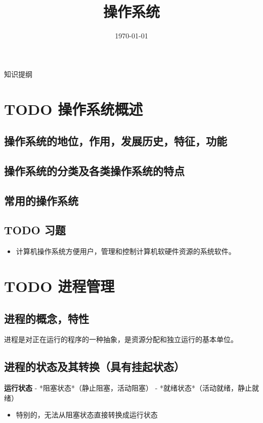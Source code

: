\documentclass[11pt]{article}
\date{\today}
\title{操作系统}
\begin{document}
\maketitle
\tableofcontents

知识提纲
\section{{\bfseries\sffamily TODO} 操作系统概述}
\label{sec-1}
\subsection{操作系统的地位，作用，发展历史，特征，功能}
\label{sec-1-1}
\subsection{操作系统的分类及各类操作系统的特点}
\label{sec-1-2}
\subsection{常用的操作系统}
\label{sec-1-3}
\subsection{{\bfseries\sffamily TODO} 习题}
\label{sec-1-4}
\begin{itemize}
\item 计算机操作系统方便用户，管理和控制计算机软硬件资源的系统软件。
\end{itemize}
\section{{\bfseries\sffamily TODO} 进程管理}
\label{sec-2}
\subsection{进程的概念，特性}
\label{sec-2-1}
进程是对正在运行的程序的一种抽象，是资源分配和独立运行的基本单位。
\subsection{进程的状态及其转换（具有挂起状态）}
\label{sec-2-2}
\textbf{运行状态} - *阻塞状态*（静止阻塞，活动阻塞） - *就绪状态*（活动就绪，静止就绪）
\begin{itemize}
\item 特别的，无法从阻塞状态直接转换成运行状态
\end{itemize}
\end{document}
